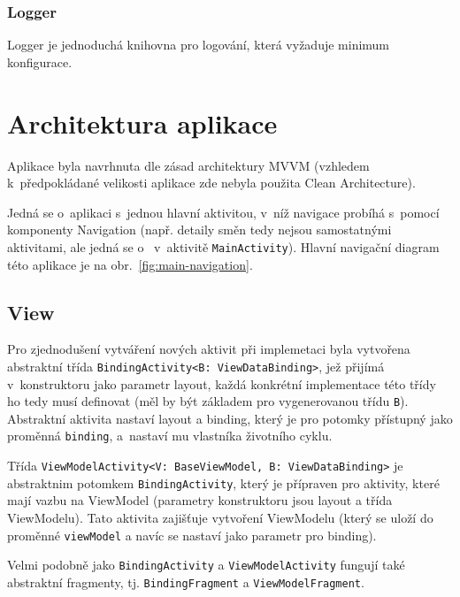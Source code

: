 \documentclass[twoside]{ctuthesis}
\begin{document}

\subsubsection{Logger}
Logger \cite{obut2020logger} je jednoduchá knihovna pro logování, která vyžaduje minimum konfigurace.

\newpage
\section{Architektura aplikace}

Aplikace byla navrhnuta dle zásad architektury MVVM (vzhledem k~před\-po\-klá\-da\-né velikosti aplikace zde nebyla použita Clean Architecture).

Jedná se o~aplikaci s~jednou hlavní aktivitou, v~níž navigace probíhá s~pomocí komponenty Navigation (např. detaily směn tedy nejsou sa\-mos\-tat\-ný\-mi aktivitami, ale jedná se o~ v~aktivitě \texttt{MainActivity}). Hlavní navigační diagram této aplikace je na obr.~\ref{fig:main-navigation}.


\subsection{View}

Pro zjednodušení vytváření nových aktivit při implemetaci byla vytvořena abstraktní třída \texttt{BindingActivity<B: ViewDataBinding>}, jež přijímá v~kon\-struk\-to\-ru jako parametr layout, každá konkrétní implementace této třídy ho tedy musí definovat (měl by být základem pro vygenerovanou třídu \texttt{B}). Abstraktní aktivita nastaví layout a binding, který je pro potomky přístupný jako proměnná \texttt{binding}, a~nastaví mu vlastníka životního cyklu.

Třída \texttt{ViewModelActivity<V: BaseViewModel, B:  ViewDataBinding>} je abstraktnim potomkem \texttt{BindingActivity}, který je přípraven pro aktivity, které mají vazbu na ViewModel (parametry konstruktoru jsou layout a třída ViewModelu). Tato aktivita zajišťuje vytvoření ViewModelu (který se uloží do proměnné \texttt{viewModel} a navíc se nastaví jako parametr pro binding).

Velmi podobně jako \texttt{BindingActivity} a \texttt{ViewModelActivity} fungují také abstraktní fragmenty, tj. \texttt{BindingFragment} a \texttt{ViewModelFragment}.
\end{document}
